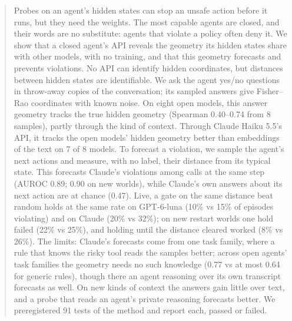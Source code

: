 \documentclass{article}
\theoremstyle{plain}
\theoremstyle{definition}
\begin{document}
\begin{abstract}
Probes on an agent's hidden states can stop an unsafe action before it runs, but they need the weights. The most capable agents are closed, and their words are no substitute: agents that violate a policy often deny it. We show that a closed agent's API reveals the geometry its hidden states share with other models, with no training, and that this geometry forecasts and prevents violations. No API can identify hidden coordinates, but distances between hidden states are identifiable. We ask the agent yes/no questions in throw-away copies of the conversation; its sampled answers give Fisher--Rao coordinates with known noise. On eight open models, this answer geometry tracks the true hidden geometry (Spearman 0.40--0.74 from 8 samples), partly through the kind of context. Through Claude Haiku 5.5's API, it tracks the open models' hidden geometry better than embeddings of the text on 7 of 8 models. To forecast a violation, we sample the agent's next actions and measure, with no label, their distance from its typical state. This forecasts Claude's violations among calls at the same step (AUROC 0.89; 0.90 on new worlds), while Claude's own answers about its next action are at chance (0.47). Live, a gate on the same distance beat random holds at the same rate on GPT-6-luna (10\% vs 15\% of episodes violating) and on Claude (20\% vs 32\%); on new restart worlds one hold failed (22\% vs 25\%), and holding until the distance cleared worked (8\% vs 26\%). The limits: Claude's forecasts come from one task family, where a rule that knows the risky tool reads the samples better; across open agents' task families the geometry needs no such knowledge (0.77 vs at most 0.64 for generic rules), though there an agent reasoning over its own transcript forecasts as well. On new kinds of context the answers gain little over text, and a probe that reads an agent's private reasoning forecasts better. We preregistered 91 tests of the method and report each, passed or failed.
\end{abstract}






\end{document}
